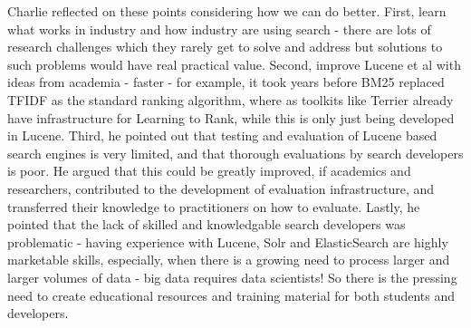 Charlie reflected on these points considering how we can do better. First, learn what works in industry and how industry are using search - there are lots of research challenges which they rarely get to solve and address but solutions to such problems would have real practical value. Second, improve Lucene et al with ideas from academia - faster - for example, it took years before BM25 replaced TFIDF as the standard ranking algorithm, where as toolkits like Terrier \cite{Ounis:2005:TIR:2149960.2150009} already have infrastructure for Learning to Rank, while this is only just being developed in Lucene. Third, he pointed out that testing and evaluation of Lucene based search engines is very limited, and that thorough evaluations by search developers is poor. He argued that this could be greatly improved, if academics and researchers, contributed to the development of evaluation infrastructure, and transferred their knowledge to practitioners on how to evaluate. Lastly, he pointed that the lack of skilled and knowledgable search developers was problematic - having experience with Lucene, Solr and ElasticSearch are highly marketable skills, especially, when there is a growing need to process larger and larger volumes of data - big data requires data scientists! So there is the pressing need to create educational resources and training material for both students and developers. 
